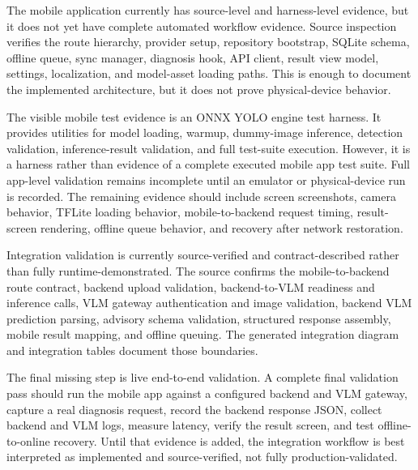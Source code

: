 
The mobile application currently has source-level and harness-level evidence, but it does not yet
have complete automated workflow evidence. Source inspection verifies the route hierarchy,
provider setup, repository bootstrap, SQLite schema, offline queue, sync manager, diagnosis hook,
API client, result view model, settings, localization, and model-asset loading paths. This is
enough to document the implemented architecture, but it does not prove physical-device behavior.

The visible mobile test evidence is an ONNX YOLO engine test harness. It provides utilities for
model loading, warmup, dummy-image inference, detection validation, inference-result validation,
and full test-suite execution. However, it is a harness rather than evidence of a complete
executed mobile app test suite. Full app-level validation remains incomplete until an emulator or
physical-device run is recorded. The remaining evidence should include screen screenshots, camera
behavior, TFLite loading behavior, mobile-to-backend request timing, result-screen rendering,
offline queue behavior, and recovery after network restoration.


Integration validation is currently source-verified and contract-described rather than fully
runtime-demonstrated. The source confirms the mobile-to-backend route contract, backend upload
validation, backend-to-VLM readiness and inference calls, VLM gateway authentication and image
validation, backend VLM prediction parsing, advisory schema validation, structured response
assembly, mobile result mapping, and offline queuing. The generated integration diagram and
integration tables document those boundaries.

The final missing step is live end-to-end validation. A complete final validation pass should run
the mobile app against a configured backend and VLM gateway, capture a real diagnosis request,
record the backend response JSON, collect backend and VLM logs, measure latency, verify the result
screen, and test offline-to-online recovery. Until that evidence is added, the integration
workflow is best interpreted as implemented and source-verified, not fully production-validated.

